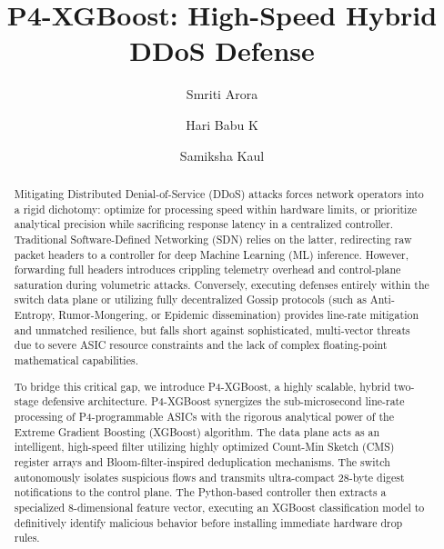 \documentclass[sigconf, nonacm]{acmart}
\begin{document}
\title{P4-XGBoost: High-Speed Hybrid DDoS Defense}

\author{Smriti Arora}

\author{Hari Babu K}

\author{Samiksha Kaul}

\begin{abstract}
Mitigating Distributed Denial-of-Service (DDoS) attacks forces network operators into a rigid dichotomy: optimize for processing speed within hardware limits, or prioritize analytical precision while sacrificing response latency in a centralized controller. Traditional Software-Defined Networking (SDN) relies on the latter, redirecting raw packet headers to a controller for deep Machine Learning (ML) inference. However, forwarding full headers introduces crippling telemetry overhead and control-plane saturation during volumetric attacks. Conversely, executing defenses entirely within the switch data plane or utilizing fully decentralized Gossip protocols (such as Anti-Entropy, Rumor-Mongering, or Epidemic dissemination) provides line-rate mitigation and unmatched resilience, but falls short against sophisticated, multi-vector threats due to severe ASIC resource constraints and the lack of complex floating-point mathematical capabilities. 

To bridge this critical gap, we introduce P4-XGBoost, a highly scalable, hybrid two-stage defensive architecture. P4-XGBoost synergizes the sub-microsecond line-rate processing of P4-programmable ASICs with the rigorous analytical power of the Extreme Gradient Boosting (XGBoost) algorithm. The data plane acts as an intelligent, high-speed filter utilizing highly optimized Count-Min Sketch (CMS) register arrays and Bloom-filter-inspired deduplication mechanisms. The switch autonomously isolates suspicious flows and transmits ultra-compact 28-byte digest notifications to the control plane. The Python-based controller then extracts a specialized 8-dimensional feature vector, executing an XGBoost classification model to definitively identify malicious behavior before installing immediate hardware drop rules. 


\end{abstract}
\end{document}
